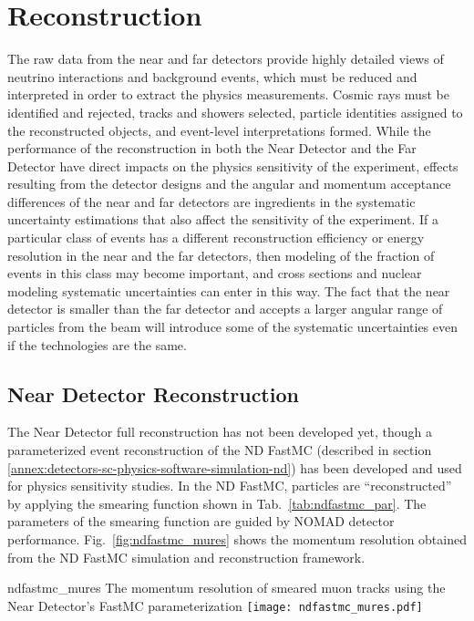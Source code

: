 \chapter{Reconstruction}
\label{annex:detectors-sc-physics-software-reconstruction}

The raw data from the near and far detectors provide highly detailed views of neutrino
interactions and background events, which must be reduced and interpreted in order to
extract the physics measurements.  Cosmic rays must be identified and rejected, tracks and
showers selected, particle identities assigned to the reconstructed objects, and event-level
interpretations formed.  While the performance of the reconstruction in both the Near Detector
and the Far Detector have direct impacts on the physics sensitivity of the experiment, effects
resulting from the detector designs and the angular and momentum acceptance differences of the
near and far detectors are ingredients in the systematic uncertainty estimations that also
affect the sensitivity of the experiment.  If a particular class of events has a different
reconstruction efficiency or energy resolution in the near and the far detectors, then modeling of the fraction of events
in this class may become important, and cross sections and nuclear modeling systematic uncertainties
can enter in this way.  The fact that the near detector is smaller than the far detector and accepts a larger
angular range of particles from the beam will introduce some of the systematic uncertainties even if the
technologies are the same. 

\section{Near Detector Reconstruction}
\label{annex:detectors-sc-physics-software-reconstruction-nd}

The Near Detector full reconstruction has not been developed yet, though a parameterized event
reconstruction of the ND FastMC (described in section \ref{annex:detectors-sc-physics-software-simulation-nd})
has been developed and used for physics sensitivity studies.  In the ND FastMC, particles are ``reconstructed''
by applying the smearing function shown in Tab.~\ref{tab:ndfastmc_par}.  The parameters of the smearing
function are guided by NOMAD detector performance.  Fig.~\ref{fig:ndfastmc_mures} shows
the momentum resolution obtained from the ND FastMC simulation and reconstruction framework.

\begin{cdrfigure}{ndfastmc_mures}
{The momentum resolution of smeared muon tracks using the Near Detector's FastMC parameterization}
\texttt{[image: ndfastmc\_mures.pdf]}
\end{cdrfigure}


